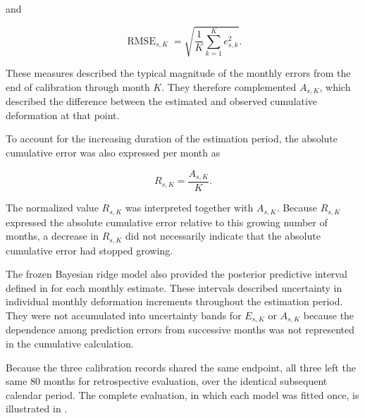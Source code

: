 and

\begin{equation}
\operatorname{RMSE}_{s,K}
=
\sqrt{
\frac{1}{K}
\sum_{k=1}^{K}
e_{s,k}^{2}
}.
\label{eq:stoppage_running_rmse}
\end{equation}

These measures described the typical magnitude of the monthly errors from the end of calibration through month $K$. They therefore complemented $A_{s,K}$, which described the difference between the estimated and observed cumulative deformation at that point.

To account for the increasing duration of the estimation period, the absolute cumulative error was also expressed per month as

\begin{equation}
R_{s,K}
=
\frac{A_{s,K}}{K}.
\label{eq:stoppage_horizon_normalized_error}
\end{equation}

The normalized value $R_{s,K}$ was interpreted together with $A_{s,K}$. Because $R_{s,K}$ expressed the absolute cumulative error relative to this growing number of months, a decrease in $R_{s,K}$ did not necessarily indicate that the absolute cumulative error had stopped growing.

The frozen Bayesian ridge model also provided the posterior predictive interval defined in  for each monthly estimate. These intervals described uncertainty in individual monthly deformation increments throughout the estimation period. They were not accumulated into uncertainty bands for $E_{s,K}$ or $A_{s,K}$ because the dependence among prediction errors from successive months was not represented in the cumulative calculation.

Because the three calibration records shared the same endpoint, all three left the same 80 months for retrospective evaluation, over the identical subsequent calendar period. The complete evaluation, in which each model was fitted once, is illustrated in .

